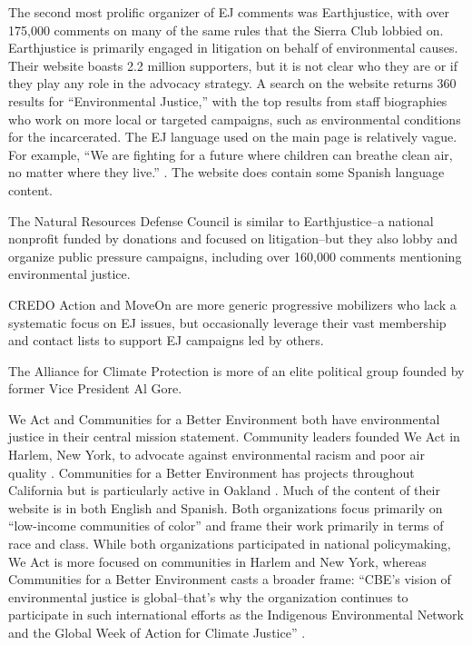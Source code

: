\documentclass[
      12pt,
        ]{article}
\begin{document}
The second most prolific organizer of EJ comments was Earthjustice, with over 175,000 comments on many of the same rules that the Sierra Club lobbied on. Earthjustice is primarily engaged in litigation on
behalf of environmental causes. Their website boasts 2.2 million
supporters, but it is not clear who they are or if they play any role in
the advocacy strategy. A search on the website returns 360 results for
``Environmental Justice,'' with the top results from staff biographies
who work on more local or targeted campaigns, such as environmental conditions
for the incarcerated. The EJ language used on the
main page is relatively vague. For example, ``We are fighting for a future
where children can breathe clean air, no matter where they live.''
\citep{Earthjustice2017}. The website does contain some Spanish language content.

The Natural Resources Defense Council is similar to Earthjustice--a
national nonprofit funded by donations and focused on litigation--but
they also lobby and organize public pressure campaigns, including over 160,000 comments mentioning environmental justice.

CREDO Action and MoveOn are more generic progressive
mobilizers who lack a systematic focus on EJ issues,
but occasionally leverage their vast membership and contact lists to support
EJ campaigns led by others.

The Alliance for Climate Protection is more of an elite political group founded by former Vice President Al Gore.

We Act and Communities for a Better Environment both have environmental
justice in their central mission statement. Community leaders founded We Act in Harlem, New York, to advocate against environmental racism and poor air quality \citep{WEACT2017}. Communities for a Better Environment has projects throughout California but is particularly
active in Oakland \citep{CBECAL2017}. Much of the
content of their website is in both English and Spanish. Both
organizations focus primarily on ``low-income communities of color'' and frame their work primarily in terms of race and class. While both
organizations participated in national policymaking, We Act is more
focused on communities in Harlem and New York, whereas Communities for a
Better Environment casts a broader frame: ``CBE's vision of environmental
justice is global--that's why the organization continues to participate
in such international efforts as the Indigenous Environmental Network
and the Global Week of Action for Climate Justice'' \citep{CBECAL2017}.
\end{document}
